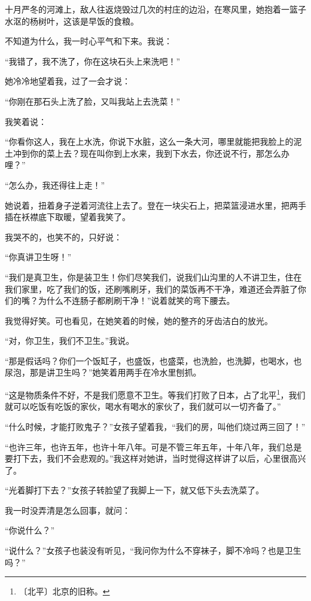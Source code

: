 \documentclass[12pt,UTF-8,openany]{ctexbook}
\begin{document}
\begin{large}
    十月严冬的河滩上，敌人往返烧毁过几次的村庄的边沿，在寒风里，她抱着一篮子水沤的杨树叶，这该是早饭的食粮。
    
    不知道为什么，我一时心平气和下来。我说：
    
    “我错了，我不洗了，你在这块石头上来洗吧！”
    
    她冷冷地望着我，过了一会才说：
    
    “你刚在那石头上洗了脸，又叫我站上去洗菜！”
    
    我笑着说：
    
    “你看你这人，我在上水洗，你说下水脏，这么一条大河，哪里就能把我脸上的泥土冲到你的菜上去？现在叫你到上水来，我到下水去，你还说不行，那怎么办哩？”
    
    “怎么办，我还得往上走！”
    
    她说着，扭着身子逆着河流往上去了。登在一块尖石上，把菜篮浸进水里，把两手插在袄襟底下取暖，望着我笑了。
    
    我哭不的，也笑不的，只好说：
    
    “你真讲卫生呀！”
    
    “我们是真卫生，你是装卫生！你们尽笑我们，说我们山沟里的人不讲卫生，住在我们家里，吃了我们的饭，还刷嘴刷牙，我们的菜饭再不干净，难道还会弄脏了你们的嘴？为什么不连肠子都刷刷干净！”说着就笑的弯下腰去。
    
    我觉得好笑。可也看见，在她笑着的时候，她的整齐的牙齿洁白的放光。
    
    “对，你卫生，我们不卫生。”我说。
    
    “那是假话吗？你们一个饭缸子，也盛饭，也盛菜，也洗脸，也洗脚，也喝水，也尿泡，那是讲卫生吗？”她笑着用两手在冷水里刨抓。
    
    “这是物质条件不好，不是我们愿意不卫生。等我们打败了日本，占了北平\footnote{〔北平〕北京的旧称。}，我们就可以吃饭有吃饭的家伙，喝水有喝水的家伙了，我们就可以一切齐备了。”
    
    “什么时候，才能打败鬼子？”女孩子望着我，“我们的房，叫他们烧过两三回了！”
    
    “也许三年，也许五年，也许十年八年。可是不管三年五年，十年八年，我们总是要打下去，我们不会悲观的。”我这样对她讲，当时觉得这样讲了以后，心里很高兴了。
    
    “光着脚打下去？”女孩子转脸望了我脚上一下，就又低下头去洗菜了。
    
    我一时没弄清是怎么回事，就问：
    
    “你说什么？”
    
    “说什么？”女孩子也装没有听见，“我问你为什么不穿袜子，脚不冷吗？也是卫生吗？”
    

\end{large}
\end{document}
